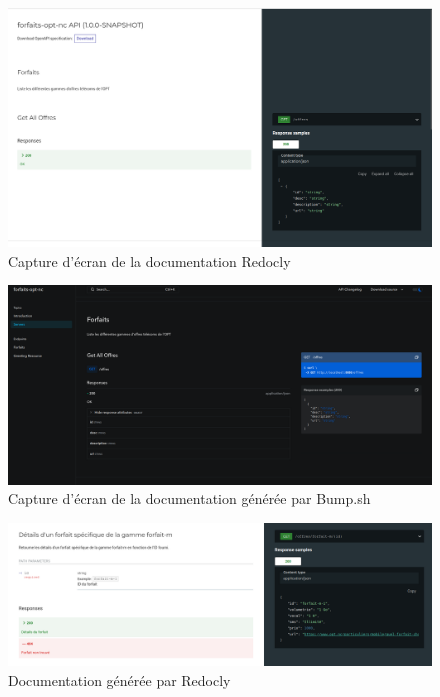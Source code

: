 \documentclass[11pt]{article}
\begin{document}
		\begin{figure}[H]
			\centering
			\includegraphics[width=\textwidth]{asset/redocly.png}
			\caption{Capture d'écran de la documentation Redocly}
			\label{fig:html_redocly}
		\end{figure}
		\begin{figure}[H]
			\centering
			\includegraphics[width=\textwidth]{asset/bump-sh-documentation.png}
			\caption{Capture d'écran de la documentation générée par Bump.sh}
			\label{fig:bumpsh}
		\end{figure}
		\begin{figure}[H]
			\centering
			\includegraphics[width=\textwidth]{asset/Redocly_v2.png}
			\caption{Documentation générée par Redocly}
			\label{fig:redocly}
		\end{figure}
\end{document}
